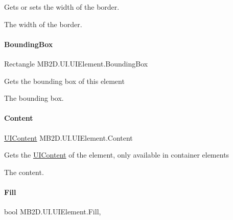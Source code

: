 Gets or sets the width of the border. 

The width of the border.\hypertarget{class_m_b2_d_1_1_u_i_1_1_u_i_element_a840da120eb79b7ce0382e6c0a9d0a482}{}\label{class_m_b2_d_1_1_u_i_1_1_u_i_element_a840da120eb79b7ce0382e6c0a9d0a482} 
\paragraph{\texorpdfstring{Bounding\+Box}{BoundingBox}}
{\footnotesize\ttfamily Rectangle M\+B2\+D.\+U\+I.\+U\+I\+Element.\+Bounding\+Box\hspace{0.3cm}{\ttfamily [get]}}



Gets the bounding box of this element 

The bounding box.\hypertarget{class_m_b2_d_1_1_u_i_1_1_u_i_element_aa8ea5b853315a074a1a745c54c83404f}{}\label{class_m_b2_d_1_1_u_i_1_1_u_i_element_aa8ea5b853315a074a1a745c54c83404f} 
\paragraph{\texorpdfstring{Content}{Content}}
{\footnotesize\ttfamily \hyperlink{class_m_b2_d_1_1_u_i_1_1_u_i_content}{U\+I\+Content} M\+B2\+D.\+U\+I.\+U\+I\+Element.\+Content\hspace{0.3cm}{\ttfamily [get]}}



Gets the \hyperlink{class_m_b2_d_1_1_u_i_1_1_u_i_content}{U\+I\+Content} of the element, only available in container elements 

The content.\hypertarget{class_m_b2_d_1_1_u_i_1_1_u_i_element_a4bd0871f3e17f95b35aef3f3292bd89e}{}\label{class_m_b2_d_1_1_u_i_1_1_u_i_element_a4bd0871f3e17f95b35aef3f3292bd89e} 
\paragraph{\texorpdfstring{Fill}{Fill}}
{\footnotesize\ttfamily bool M\+B2\+D.\+U\+I.\+U\+I\+Element.\+Fill\hspace{0.3cm}{\ttfamily [get]}, {\ttfamily [set]}}



